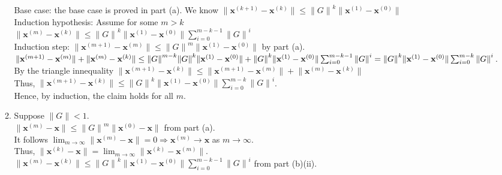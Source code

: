 \documentclass[10pt]{article}
\begin{document}
\begin{enumerate}[label=(\alph*)]
\begin{enumerate}[label=(\roman*)]
      Base case: the base case is proved in part (a). We know $\lVert \mathbf{x}^{(k+1)}-\mathbf{x}^{(k)}\rVert\le{\lVert G\rVert}^{k}\lVert \mathbf{x}^{(1)}-\mathbf{x}^{(0)}\rVert$\\
      Induction hypothesis: Assume for some $m>k$\\
      $\displaystyle\lVert\mathbf{x}^{(m)}-\mathbf{x}^{(k)}\rVert\le{\lVert G\rVert}^{k}\lVert\mathbf{x}^{(1)}-\mathbf{x}^{(0)}\rVert\sum_{i=0}^{m-k-1}{\lVert G\rVert}^{i}$\\
      Induction step: $\lVert \mathbf{x}^{(m+1)}-\mathbf{x}^{(m)}\rVert\le{\lVert G\rVert}^{m}\lVert \mathbf{x}^{(1)}-\mathbf{x}^{(0)}\rVert$ by part (a).\\
      $\lVert \mathbf{x}^{(m+1)}-\mathbf{x}^{(m)}\rVert+\lVert\mathbf{x}^{(m)}-\mathbf{x}^{(k)}\rVert\\
      \le{\lVert G\rVert}^{m-k}{\lVert G\rVert}^{k}\lVert \mathbf{x}^{(1)}-\mathbf{x}^{(0)}\rVert+{\lVert G\rVert}^{k}\lVert\mathbf{x}^{(1)}-\mathbf{x}^{(0)}\rVert\sum_{i=0}^{m-k-1}{\lVert G\rVert}^{i}\\
      ={\lVert G\rVert}^{k}\lVert\mathbf{x}^{(1)}-\mathbf{x}^{(0)}\rVert\sum_{i=0}^{m-k}{\lVert G\rVert}^{i}$.\\
      By the triangle innequality $\lVert\mathbf{x}^{(m+1)}-\mathbf{x}^{(k)}\rVert\le\lVert\mathbf{x}^{(m+1)}-\mathbf{x}^{(m)}\rVert+\lVert\mathbf{x}^{(m)}-\mathbf{x}^{(k)}\rVert$\\
      Thus, $\displaystyle\lVert\mathbf{x}^{(m+1)}-\mathbf{x}^{(k)}\rVert\le{\lVert G\rVert}^{k}\lVert\mathbf{x}^{(1)}-\mathbf{x}^{(0)}\rVert\sum_{i=0}^{m-k}{\lVert G\rVert}^{i}$.\\
      Hence, by induction, the claim holds for all $m$.
      \item Suppose $\lVert G\rVert<1$.\\
      $\lVert \mathbf{x}^{(m)}-\mathbf{x}\rVert\le {\lVert G\rVert}^m\lVert \mathbf{x}^{(0)}-\mathbf{x}\rVert$ from part (a).\\
      It follows $\displaystyle \lim_{m\rightarrow \infty}\lVert\mathbf{x}^{(m)}-\mathbf{x}\rVert=0\Rightarrow \mathbf{x}^{(m)}\rightarrow \mathbf{x}$ as $m\rightarrow \infty$.\\
      Thus, $\displaystyle\lVert\mathbf{x}^{(k)}-\mathbf{x}\rVert=\lim_{m\rightarrow\infty}\lVert\mathbf{x}^{(k)}-\mathbf{x}^{(m)}\rVert$.\\
      $\displaystyle\lVert\mathbf{x}^{(m)}-\mathbf{x}^{(k)}\rVert\le{\lVert G\rVert}^{k}\lVert\mathbf{x}^{(1)}-\mathbf{x}^{(0)}\rVert\sum_{i=0}^{m-k-1}{\lVert G\rVert}^{i}$ from part (b)(ii).\\

\end{enumerate}
\end{enumerate}
\end{document}
